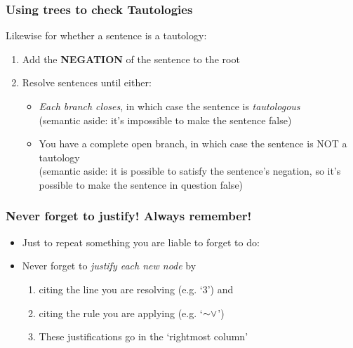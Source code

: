 \begin{frame}
\frametitle{Using trees to check Tautologies}

Likewise for whether a sentence is a tautology:

\begin{enumerate}[<+->]


\item Add the \textbf{NEGATION} of the sentence to the root

\item Resolve sentences until either:

\medskip

\begin{itemize}

\item \emph{Each branch closes}, in which case the sentence is \emph{tautologous} \\ (semantic aside: it's impossible to make the sentence false)

\item You have \textcolor{OGlyallpink}{a complete open branch}, in which case the sentence is NOT a tautology \\ (semantic aside: it is possible to satisfy the sentence's negation, so it's possible to make the sentence in question false)

\end{itemize}

\end{enumerate}

\end{frame}

\begin{frame}
\frametitle{Never forget to justify! Always remember!}

\begin{itemize}[<+->]

\item Just to repeat something you are liable to forget to do:

\item Never forget to \emph{justify each new node} by 

\begin{enumerate}[1.)]

\item citing the line you are resolving (e.g. `3') and

\item citing the rule you are applying (e.g. `$\enot \eor$')

\item[] These justifications go in the `rightmost column'

\end{enumerate}

\end{itemize}
\end{frame}

